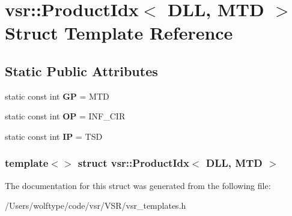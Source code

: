 \hypertarget{structvsr_1_1_product_idx_3_01_d_l_l_00_01_m_t_d_01_4}{\section{vsr\-:\-:Product\-Idx$<$ D\-L\-L, M\-T\-D $>$ Struct Template Reference}
\label{structvsr_1_1_product_idx_3_01_d_l_l_00_01_m_t_d_01_4}
}
\subsection*{Static Public Attributes}
\begin{DoxyCompactItemize}
\item 
\hypertarget{structvsr_1_1_product_idx_3_01_d_l_l_00_01_m_t_d_01_4_a4c35824f35f3d229b183c55a7be8beec}{static const int {\bfseries G\-P} = M\-T\-D}\label{structvsr_1_1_product_idx_3_01_d_l_l_00_01_m_t_d_01_4_a4c35824f35f3d229b183c55a7be8beec}

\item 
\hypertarget{structvsr_1_1_product_idx_3_01_d_l_l_00_01_m_t_d_01_4_a59d9af6c54ec5234e4dc73586fa6b7ca}{static const int {\bfseries O\-P} = I\-N\-F\-\_\-\-C\-I\-R}\label{structvsr_1_1_product_idx_3_01_d_l_l_00_01_m_t_d_01_4_a59d9af6c54ec5234e4dc73586fa6b7ca}

\item 
\hypertarget{structvsr_1_1_product_idx_3_01_d_l_l_00_01_m_t_d_01_4_a43783904c3746654472cdaabb5304c55}{static const int {\bfseries I\-P} = T\-S\-D}\label{structvsr_1_1_product_idx_3_01_d_l_l_00_01_m_t_d_01_4_a43783904c3746654472cdaabb5304c55}

\end{DoxyCompactItemize}
\subsubsection*{template$<$$>$ struct vsr\-::\-Product\-Idx$<$ D\-L\-L, M\-T\-D $>$}



The documentation for this struct was generated from the following file\-:\begin{DoxyCompactItemize}
\item 
/\-Users/wolftype/code/vsr/\-V\-S\-R/vsr\-\_\-templates.\-h\end{DoxyCompactItemize}
